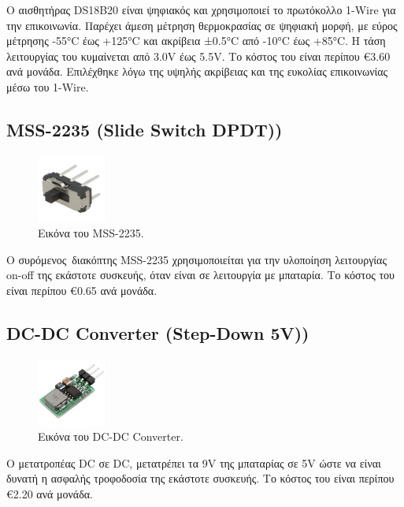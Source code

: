 \documentclass[conference]{IEEEtran}
\begin{document}
Ο αισθητήρας DS18B20 είναι ψηφιακός και χρησιμοποιεί το πρωτόκολλο 1-Wire για την επικοινωνία. Παρέχει άμεση μέτρηση θερμοκρασίας σε ψηφιακή μορφή, με εύρος μέτρησης -55°C έως +125°C και ακρίβεια ±0.5°C από -10°C έως +85°C. Η τάση λειτουργίας του κυμαίνεται από 3.0V έως 5.5V. Το κόστος του είναι περίπου €3.60 ανά μονάδα. Επιλέχθηκε λόγω της υψηλής ακρίβειας και της ευκολίας επικοινωνίας μέσω του 1-Wire. \cite{ds18b20}

\subsection{MSS-2235 (Slide Switch DPDT))}

\begin{figure}[H]
	\centerline{\includegraphics[width=0.2\textwidth]{assets/switch}}
	\caption{Εικόνα του MSS-2235.}
	\label{Εικόνα του MSS-2235.}
\end{figure}

Ο συρόμενος διακόπτης MSS-2235 χρησιμοποιείται για την υλοποίηση λειτουργίας on-off της εκάστοτε συσκευής, όταν είναι σε λειτουργία με μπαταρία. Το κόστος του είναι περίπου €0.65 ανά μονάδα. \cite{mss2235}

\subsection{DC-DC Converter (Step-Down 5V))}

\begin{figure}[H]
	\centerline{\includegraphics[width=0.2\textwidth]{assets/dc2dc}}
	\caption{Εικόνα του DC-DC Converter.}
	\label{Εικόνα του DC-DC Converter.}
\end{figure}

Ο μετατροπέας DC σε DC, μετατρέπει τα 9V της μπαταρίας σε 5V ώστε να είναι δυνατή η ασφαλής τροφοδοσία της εκάστοτε συσκευής. Το κόστος του είναι περίπου €2.20 ανά μονάδα. \cite{dc2dc}
\end{document}
